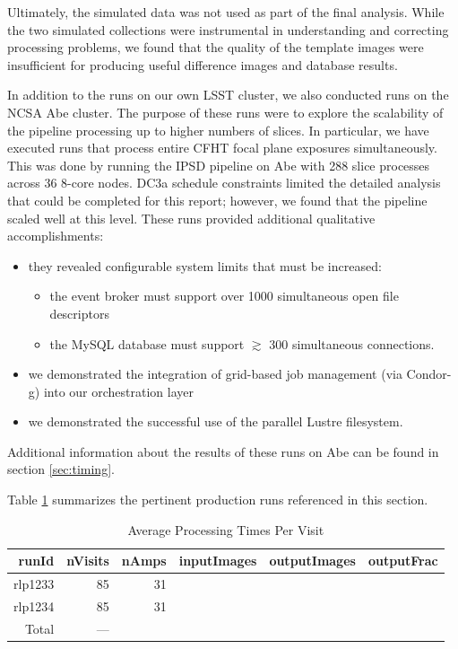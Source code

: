 Ultimately, the simulated data was not used as part of the final
analysis.  While the two simulated collections were instrumental
in understanding and correcting processing problems, we found that the
quality of the template images were insufficient for producing useful
difference images and database results.  

In addition to the runs on our own LSST cluster, we also conducted
runs on the NCSA Abe cluster.  The purpose of these runs were to
explore the scalability of the pipeline processing up to higher
numbers of slices.  In particular, we have executed runs that process
entire CFHT focal plane exposures simultaneously.  This was done by
running the IPSD pipeline on Abe with 288 slice processes across 36
8-core nodes.  DC3a schedule constraints limited the detailed analysis
that could be completed for this report; however, we found that the
pipeline scaled well at this level.  These runs provided additional
qualitative accomplishments:

\begin{itemize}
\item they revealed configurable system limits that must be increased:
\begin{itemize}
\item the event broker must support over 1000 simultaneous open file
  descriptors 
\item the MySQL database must support $\gtrsim$ 300 simultaneous
  connections.  
\end{itemize}
\item we demonstrated the integration of grid-based job management
  (via Condor-g) into our orchestration layer
\item we demonstrated the successful use of the parallel Lustre
  filesystem.  
\end{itemize}

\noindent Additional information about the results of these runs on
Abe can be found in section \ref{sec:timing}.  

Table \ref{tbl:runsummary} summarizes the pertinent production runs
referenced in this section.

\begin{table}[htbp]
\centering
\caption{Average Processing Times Per Visit
\label{tbl:runsummary}}
\vspace{\baselineskip}
\begin{tabular}{ | r | r | r | r | r | r |}
\hline\hline
runId & nVisits & nAmps & inputImages & outputImages & outputFrac \\ \hline
rlp1233 & 85  & 31 &  &  &  \\ \hline
rlp1234 & 85  & 31 &  &  &  \\ \hline
Total   & --- &    &  &  &  \\ \hline
\end{tabular}
\end{table}

